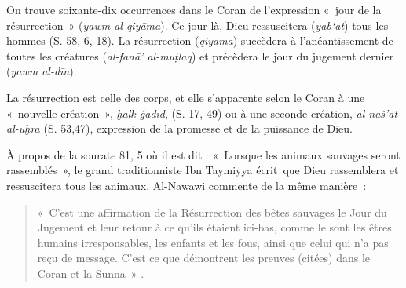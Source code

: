

On trouve soixante-dix occurrences dans le Coran de l'expression «~jour
de la résurrection~» (\emph{yawm al-qiyāma}). Ce jour-là, Dieu
ressuscitera (\emph{yab`aṯ}) tous les hommes (S. 58, 6, 18). La
résurrection (\emph{qiyāma}) succèdera à l'anéantissement de toutes les
créatures (\emph{al-fanā' al-muṭlaq}) et précèdera le jour du jugement
dernier (\emph{yawm al-dīn}).

La résurrection est celle des corps, et elle s'apparente selon le Coran
à une «~nouvelle création~», \emph{ḫalk ǧadīd}, (S. 17, 49) ou à une
seconde création, \emph{al-naš'at al-uḫrā} (S. 53,47), expression de la
promesse et de la puissance de Dieu.

À propos de la sourate 81, 5 où il est dit : «~Lorsque les animaux
sauvages seront rassemblés~», le grand traditionniste Ibn Taymiyya
écrit~que Dieu rassemblera et ressuscitera tous les animaux. Al-Nawawi
commente de la même manière~: 

\begin{quote}
  «~C'est une affirmation de la Résurrection
des bêtes sauvages le Jour du Jugement et leur retour à ce qu'ils
étaient ici-bas, comme le sont les êtres humains irresponsables, les
enfants et les fous, ainsi que celui qui n'a pas reçu de message. C'est
ce que démontrent les preuves (citées) dans le Coran et la
Sunna~»  .
\end{quote}

